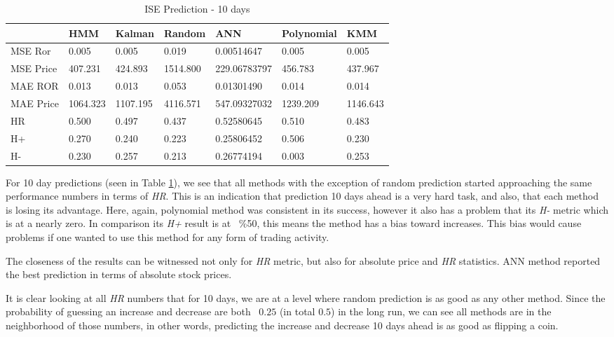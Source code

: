\begin{table}[h]
\caption{\label{table3}ISE Prediction - 10 days}
\vspace{0.3cm}
\begin{tabular}{|l|l|l|l|l|l|l|}
\hline
 &                  HMM &       Kalman &   Random &        ANN &     Polynomial &    KMM\\
\hline
   MSE Ror &      0.005 &      0.005 &      0.019 & 0.00514647 &      0.005 &      0.005\\
\hline
 MSE Price &    407.231 &    424.893 &   1514.800 & 229.06783797 &    456.783 &    437.967\\
\hline
   MAE ROR &      0.013 &      0.013 &      0.053 & 0.01301490 &      0.014 &      0.014\\
\hline
 MAE Price &   1064.323 &   1107.195 &   4116.571 & 547.09327032 &   1239.209 &   1146.643\\
\hline
        HR &      0.500 &      0.497 &      0.437 & 0.52580645 &      0.510 &      0.483\\
\hline
        H+ &      0.270 &      0.240 &      0.223 & 0.25806452 &      0.506 &      0.230\\
\hline
        H- &      0.230 &      0.257 &      0.213 & 0.26774194 &      0.003 &      0.253\\
\hline
\end{tabular}
\end{table}

For 10 day predictions (seen in Table \ref{table3}), we see that all methods
with the exception of random prediction started approaching the same performance
numbers in terms of {\em HR}. This is an indication that prediction 10 days
ahead is a very hard task, and also, that each method is losing its
advantage. Here, again, polynomial method was consistent in its success, however
it also has a problem that its {\em H-} metric which is at a nearly zero. In
comparison its {\em H+} result is at ~\%50, this means the method has a
bias toward increases. This bias would cause problems if one wanted to use this
method for any form of trading activity.

The closeness of the results can be witnessed not only for {\em HR} metric, but
also for absolute price and {\em HR} statistics. ANN method reported the best
prediction in terms of absolute stock prices.

It is clear looking at all {\em HR} numbers that for 10 days, we are at a level
where random prediction is as good as any other method. Since the probability of
guessing an increase and decrease are both ~$0.25$ (in total $0.5$) in the long
run, we can see all methods are in the neighborhood of those numbers, in other
words, predicting the increase and decrease 10 days ahead is as good as flipping
a coin.

